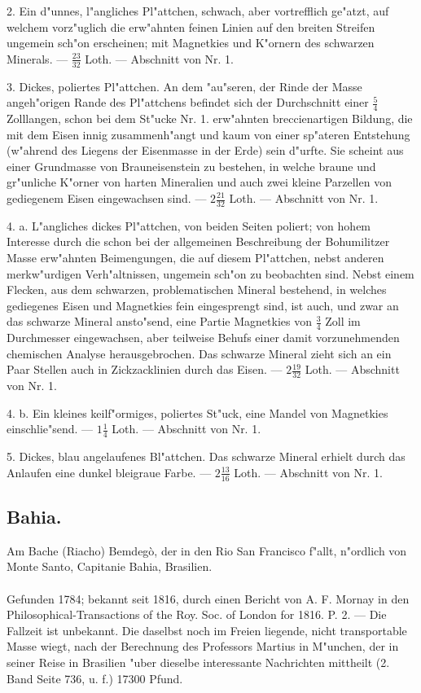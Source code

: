 \documentclass[a4paper, 11pt, oneside, polutonikogreek, german]{article}
\begin{document}
2. Ein d"unnes, l"angliches Pl"attchen, schwach, aber vortrefflich ge"atzt, auf welchem vorz"uglich die erw"ahnten feinen Linien auf den breiten Streifen ungemein sch"on erscheinen; mit Magnetkies und K"ornern des schwarzen Minerals. --- $\frac{23}{32}$ Loth. --- Abschnitt von Nr. 1.

3. Dickes, poliertes Pl"attchen. An dem "au"seren, der Rinde der Masse angeh"origen Rande des Pl"attchens befindet sich der Durchschnitt einer $\frac{5}{4}$ Zolllangen, schon bei dem St"ucke Nr. 1. erw"ahnten breccienartigen Bildung, die mit dem Eisen innig zusammenh"angt und kaum von einer sp"ateren Entstehung (w"ahrend des Liegens der Eisenmasse in der Erde) sein d"urfte. Sie scheint aus einer Grundmasse von Brauneisenstein zu bestehen, in welche braune und gr"unliche K"orner von harten Mineralien und auch zwei kleine Parzellen von gediegenem Eisen eingewachsen sind. --- $2\frac{21}{32}$ Loth. --- Abschnitt von Nr. 1.

4. a. L"angliches dickes Pl"attchen, von beiden Seiten poliert; von hohem Interesse durch die schon bei der allgemeinen Beschreibung der Bohumilitzer Masse erw"ahnten Beimengungen, die auf diesem Pl"attchen, nebst anderen merkw"urdigen Verh"altnissen, ungemein sch"on zu beobachten sind. Nebst einem Flecken, aus dem schwarzen, problematischen Mineral bestehend, in welches gediegenes Eisen und Magnetkies fein eingesprengt sind, ist auch, und zwar an das schwarze Mineral ansto"send, eine Partie Magnetkies von $\frac{3}{4}$ Zoll im Durchmesser eingewachsen, aber teilweise Behufs einer damit vorzunehmenden chemischen Analyse herausgebrochen. Das schwarze Mineral zieht sich an ein Paar Stellen auch in Zickzacklinien durch das Eisen. --- $2\frac{19}{32}$ Loth. --- Abschnitt von Nr. 1.

4. b. Ein kleines keilf"ormiges, poliertes St"uck, eine Mandel von Magnetkies einschlie"send. --- $1\frac{1}{4}$ Loth. --- Abschnitt von Nr. 1.

5. Dickes, blau angelaufenes Bl"attchen. Das schwarze Mineral erhielt durch das Anlaufen eine dunkel bleigraue Farbe. --- $2\frac{13}{16}$ Loth. --- Abschnitt von Nr. 1.
\subsection{Bahia.}
\begin{center}
\small
Am Bache (Riacho) Bemdegò, der in den Rio San Francisco f"allt, n"ordlich von Monte Santo, Capitanie Bahia, Brasilien.
\end{center}
\paragraph{}
Gefunden 1784; bekannt seit 1816, durch einen Bericht von A. F. Mornay in den Philosophical-Transactions of the Roy. Soc. of London for 1816. P. 2. --- Die Fallzeit ist unbekannt. Die daselbst noch im Freien liegende, nicht transportable Masse wiegt, nach der Berechnung des Professors Martius in M"unchen, der in seiner Reise in Brasilien "uber dieselbe interessante Nachrichten mittheilt (2. Band Seite 736, u. f.) 17300 Pfund.
\end{document}
